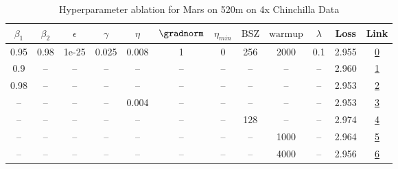 \begin{table}[H]
\centering
\caption{Hyperparameter ablation for Mars on 520m on 4x Chinchilla Data}
\label{tab:ablation_mars_520m_on_4x_chinchilla_data}
\begin{tabular}{cccccccccccc}
\toprule
$\beta_1$ & $\beta_2$ & $\epsilon$ & $\gamma$ & $\eta$ & $\gradnorm$ & $\eta_{min}$ & $\mathrm{BSZ}$ & $\mathrm{warmup}$ & $\lambda$ & Loss & Link \\
\midrule
0.95 & 0.98 & 1e-25 & 0.025 & 0.008 & 1 & 0 & 256 & 2000 & 0.1 & 2.955 & \href{https://wandb.ai/stanford-mercury/optimizer-scaling/runs/sweep-520m-42B-mars50507flr0.008-wd0.1-minlr0-warmup2000-b10.95--b5cf73}{0} \\
\midrule
0.9 & -- & -- & -- & -- & -- & -- & -- & -- & -- & 2.960 & \href{https://wandb.ai/stanford-mercury/optimizer-scaling/runs/sweep-520m-42B-marsffc1cflr0.008-wd0.1-minlr0-warmup2000-b10.9-b-c89306}{1} \\
0.98 & -- & -- & -- & -- & -- & -- & -- & -- & -- & 2.953 & \href{https://wandb.ai/stanford-mercury/optimizer-scaling/runs/sweep-520m-42B-mars10209dlr0.008-wd0.1-minlr0-warmup2000-b10.98--1ae65b}{2} \\
-- & -- & -- & -- & 0.004 & -- & -- & -- & -- & -- & 2.953 & \href{https://wandb.ai/stanford-mercury/optimizer-scaling/runs/sweep-520m-42B-marsf1861clr0.004-wd0.1-minlr0-warmup2000-b10.95--ff7186}{3} \\
-- & -- & -- & -- & -- & -- & -- & 128 & -- & -- & 2.974 & \href{https://wandb.ai/stanford-mercury/optimizer-scaling/runs/sweep-520m-42B-marsf698a0lr0.008-wd0.1-minlr0-warmup2000-b10.95--039978}{4} \\
-- & -- & -- & -- & -- & -- & -- & -- & 1000 & -- & 2.964 & \href{https://wandb.ai/stanford-mercury/optimizer-scaling/runs/sweep-520m-42B-mars396887lr0.008-wd0.1-minlr0-warmup1000-b10.95--61c217}{5} \\
-- & -- & -- & -- & -- & -- & -- & -- & 4000 & -- & 2.956 & \href{https://wandb.ai/stanford-mercury/optimizer-scaling/runs/sweep-520m-42B-mars5f83cclr0.008-wd0.1-minlr0-warmup4000-b10.95--d5771f}{6} \\
\bottomrule
\end{tabular}
\end{table}

